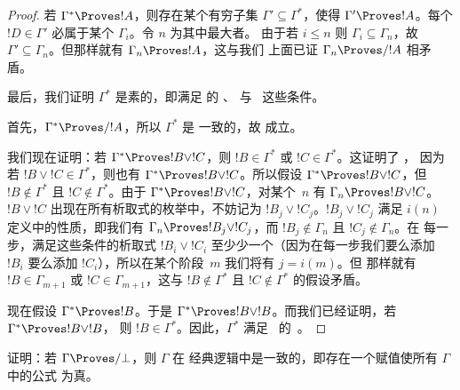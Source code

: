 \documentclass[../../../include/open-logic-section]{subfiles}
\begin{document}
\begin{proof}
  若 $\Gamma^* \Proves !A$，则存在某个有穷子集 $\Gamma'
  \subseteq \Gamma^*$，使得 $\Gamma' \Proves !A$。每个 $!D \in
  \Gamma'$ 必属于某个 $\Gamma_i$。令 $n$ 为其中最大者。
  由于若 $i \le n$ 则 $\Gamma_i \subseteq \Gamma_n$，故 $\Gamma'
  \subseteq \Gamma_n$。但那样就有 $\Gamma_n \Proves !A$，这与我们
  上面已证 $\Gamma_n \Proves/ !A$ 相矛盾。

  最后，我们证明 $\Gamma^*$ 是素的，即满足 
  的 、 与~ 这些条件。

  首先，$\Gamma^* \Proves/ !A$，所以 $\Gamma^*$ 是
  一致的，故  成立。

  我们现在证明：若 $\Gamma^* \Proves !B \lor !C$，则 $!B
  \in \Gamma^*$ 或 $!C \in \Gamma^*$。这证明了 ，
  因为若 $!B \lor !C \in \Gamma^*$，则也有 $\Gamma^* \Proves !B
  \lor !C$。所以假设 $\Gamma^* \Proves !B \lor !C$，但 $!B
  \notin \Gamma^*$ 且 $!C \notin \Gamma^*$。由于 $\Gamma^* \Proves
  !B \lor !C$，对某个~$n$ 有 $\Gamma_n \Proves !B \lor !C$。$!B \lor
  !C$ 出现在所有析取式的枚举中，不妨记为 $!B_j
  \lor !C_j$。$!B_j \lor !C_j$ 满足 $i(n)$ 定义中的性质，即我们有
  $\Gamma_n \Proves !B_j \lor !C_j$，而 $!B_j \notin \Gamma_n$ 且
  $!C_j \notin \Gamma_n$。在
  每一步，满足这些条件的析取式 $!B_i \lor !C_i$
  至少少一个（因为在每一步我们要么添加 $!B_i$
  要么添加 $!C_i$），所以在某个阶段~$m$ 我们将有 $j = i(m)$。但
  那样就有 $!B \in \Gamma_{m+1}$ 或 $!C \in \Gamma_{m+1}$，这与
  $!B \notin \Gamma^*$ 且 $!C \notin \Gamma^*$
  的假设矛盾。

  现在假设 $\Gamma^* \Proves !B$。于是 $\Gamma^* \Proves !B \lor
  !B$。而我们已经证明，若 $\Gamma^* \Proves !B \lor !B$，
  则 $!B \in \Gamma^*$。因此，$\Gamma^*$
  满足~ 的~。
\end{proof}

\begin{prob}
证明：若 $\Gamma \Proves/ \bot$，则 $\Gamma$ 在
经典逻辑中是一致的，即存在一个赋值使所有 $\Gamma$ 中的公式
为真。
\end{prob}
\end{document}
